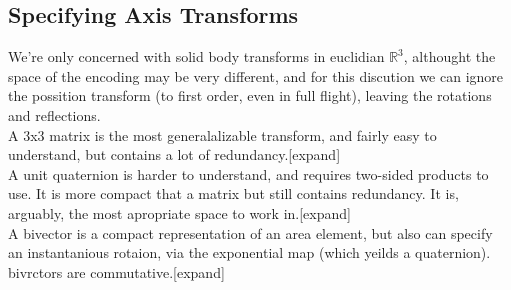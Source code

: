 \documentclass{article}
\begin{document}
\subsection{Specifying Axis Transforms}
We're only concerned with solid body transforms in euclidian
$\mathbb{R}^3$, althought the space of the encoding may be very
different, and for this discution we can ignore the possition
transform (to first order, even in full flight), leaving the rotations
and reflections.
\\
A 3x3 matrix is the most generalalizable transform, and fairly easy
to understand, but contains a lot of redundancy.[expand]
\\
A unit quaternion is harder to understand, and requires two-sided
products to use. It is more compact that a matrix but still contains
redundancy. It is, arguably, the most apropriate space to work
in.[expand]
\\
A bivector is a compact representation of an area element, but also
can specify an instantanious rotaion, via the exponential map (which
yeilds a quaternion). bivrctors are commutative.[expand]
\\
\end{document}
